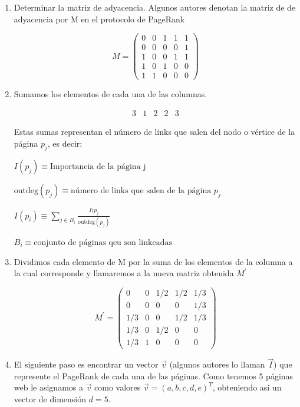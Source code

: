 \begin{enumerate}
\item Determinar la matriz de adyacencia. Algunos autores denotan la matriz de de adyacencia por M en el protocolo de PageRank

\[
M = \begin{pmatrix}
0 & 0 & 1 & 1 & 1 \\
0 & 0 & 0 & 0 & 1 \\
1 & 0 & 0 & 1 & 1 \\
1 & 0 & 1 & 0 & 0 \\
1 & 1 & 0 & 0 & 0
\end{pmatrix}
\]

\item Sumamos los elementos de cada una de las columnas.

\[
\begin{matrix}
3 & 1 & 2 & 2 & 3
\end{matrix}
\]

Estas sumas representan el número de links que salen del nodo o vértice de la página $p_j$, es decir: 

$I(p_j) \equiv \text{Importancia de la página j}$

$\mathrm{outdeg}(p_j) \equiv \text{número de links que salen de la página } p_j$

$I(p_i) \equiv \sum\limits_{j \in B_i} \frac{I(p_j}{\mathrm{outdeg}(p_j)}$

$B_i \equiv \text{conjunto de páginas qeu son linkeadas}$

\item Dividimos cada elemento de M por la suma de los elementos de la columna a la cual corresponde y llamaremos a la nueva matriz obtenida $M^\prime$

\[
M^\prime = \begin{pmatrix}
0 & 0 & 1/2 & 1/2 & 1/3 \\
0 & 0 & 0 & 0 & 1/3 \\
1/3 & 0 & 0 & 1/2 & 1/3 \\
1/3 & 0 & 1/2 & 0 & 0 \\
1/3 & 1 & 0 & 0 & 0
\end{pmatrix}
\]

\item El siguiente paso es encontrar un vector $\vec{v}$ (algunos autores lo llaman $\vec{I}$) que represente el PageRank de cada una de las páginas. Como tenemos 5 páginas web le asignamos a $\vec{v}$ como valores $\vec{v} = (a,b,c,d,e)^T$, obteniendo así un vector de dimensión $d=5$.


\end{enumerate}
